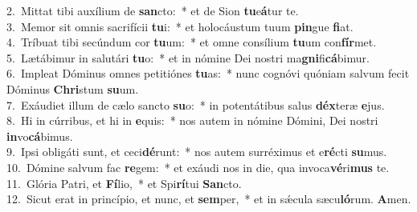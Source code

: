 {2.~}Mittat tibi auxílium de \textbf{san}cto:~* et de Sion \textbf{tu}e\textbf{á}tur te.\\
{3.~}Memor sit omnis sacrifícii \textbf{tu}i:~* et holocáustum tuum \textbf{pin}gue \textbf{fi}at.\\
{4.~}Tríbuat tibi secúndum cor \textbf{tu}um:~* et omne consílium \textbf{tu}um con\textbf{fír}met.\\
{5.~}Lætábimur in salutári \textbf{tu}o:~* et in nómine Dei nostri ma\textbf{gni}fi\textbf{cá}bimur.\\
{6.~}Impleat Dóminus omnes petitiónes \textbf{tu}as:~* nunc cognóvi quóniam salvum fecit Dóminus \textbf{Chri}stum \textbf{su}um.\\
{7.~}Exáudiet illum de cælo sancto \textbf{su}o:~* in potentátibus salus \textbf{déx}teræ \textbf{e}jus.\\
{8.~}Hi in cúrribus, et hi in \textbf{e}quis:~* nos autem in nómine Dómini, Dei nostri \textbf{in}vo\textbf{cá}bimus.\\
{9.~}Ipsi obligáti sunt, et ceci\textbf{dé}runt:~* nos autem surréximus et e\textbf{ré}cti \textbf{su}mus.\\
{10.~}Dómine salvum fac \textbf{re}gem:~* et exáudi nos in die, qua invoca\textbf{vé}ri\textbf{mus} te.\\
{11.~}Glória Patri, et \textbf{Fí}lio,~* et Spi\textbf{rí}tui \textbf{San}cto.\\
{12.~}Sicut erat in princípio, et nunc, et \textbf{sem}per,~* et in sǽcula sæcu\textbf{ló}rum. \textbf{A}men.\\
